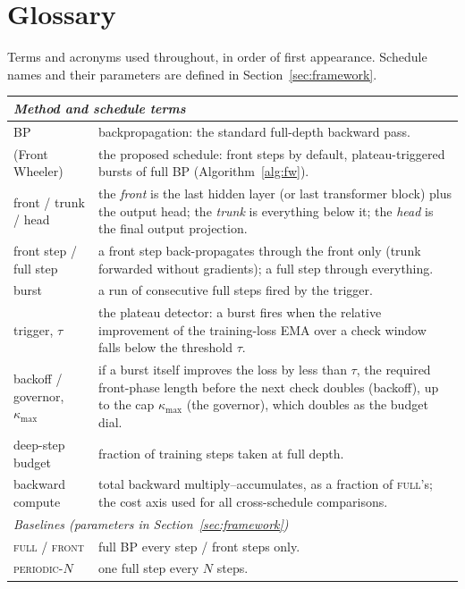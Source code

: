 \section{Glossary}
\label{sec:glossary}

Terms and acronyms used throughout, in order of first appearance. Schedule
names and their parameters are defined in Section~\ref{sec:framework}.

{\small
\begin{longtable}{p{}p{}}
\toprule
\multicolumn{2}{l}{\emph{Method and schedule terms}} \\
\midrule
BP & backpropagation: the standard full-depth backward pass. \\
\fw{} (Front Wheeler) & the proposed schedule: front steps by default,
plateau-triggered bursts of full BP (Algorithm~\ref{alg:fw}). \\
front / trunk / head & the \emph{front} is the last hidden layer (or last
transformer block) plus the output head; the \emph{trunk} is everything
below it; the \emph{head} is the final output projection. \\
front step / full step & a front step back-propagates through the front
only (trunk forwarded without gradients); a full step through everything. \\
burst & a run of consecutive full steps fired by the trigger. \\
trigger, $\tau$ & the plateau detector: a burst fires when the relative
improvement of the training-loss EMA over a check window falls below the
threshold $\tau$. \\
backoff / governor, $\kappa_{\max}$ & if a burst itself improves the loss
by less than $\tau$, the required front-phase length before the next check
doubles (backoff), up to the cap $\kappa_{\max}$ (the governor), which
doubles as the budget dial. \\
deep-step budget & fraction of training steps taken at full depth. \\
backward compute & total backward multiply--accumulates, as a fraction of
\textsc{full}'s; the cost axis used for all cross-schedule comparisons. \\
\midrule
\multicolumn{2}{l}{\emph{Baselines (parameters in
Section~\ref{sec:framework})}} \\
\midrule
\textsc{full} / \textsc{front} & full BP every step / front steps only. \\
\textsc{periodic}-$N$ & one full step every $N$ steps. \\

\end{longtable}}
